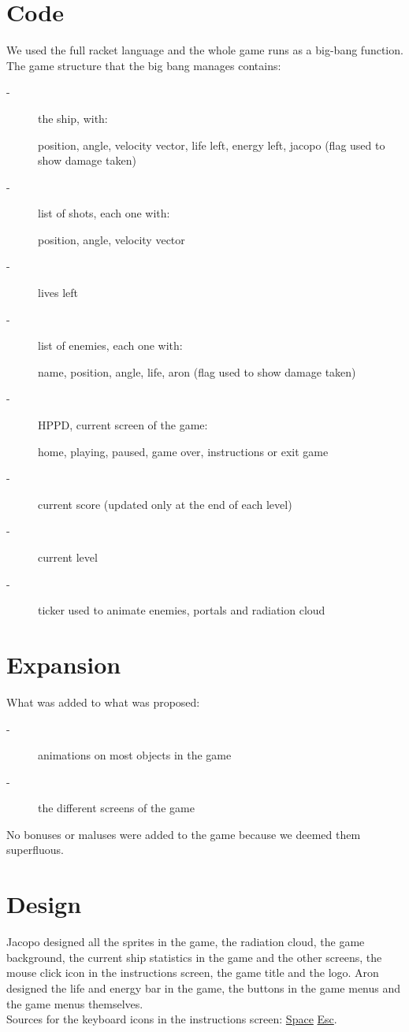 \documentclass[12pt]{article}
\begin{document}
\section*{Code}
We used the full racket language and the whole game runs as a big-bang function.
The game structure that the big bang manages contains:
\begin{description}
  \item[-] the ship, with:
  
  position, angle, velocity vector, life left, energy left, jacopo (flag used to show damage taken)
  \item[-] list of shots, each one with:
  
  position, angle, velocity vector
  \item[-] lives left
  \item[-] list of enemies, each one with:
  
  name, position, angle, life, aron (flag used to show damage taken)
  \item[-] HPPD, current screen of the game:
  
  home, playing, paused, game over, instructions or exit game
  \item[-] current score (updated only at the end of each level)
  \item[-] current level
  \item[-] ticker used to animate enemies, portals and radiation cloud
\end{description}

\section*{Expansion}
What was added to what was proposed:
\begin{description}
  \item[-] animations on most objects in the game
  \item[-] the different screens of the game
\end{description}
No bonuses or maluses were added to the game because we deemed them superfluous.


\section*{Design}
Jacopo designed all the sprites in the game, the radiation cloud, the game background, the current ship statistics in the game and the other screens, the mouse click icon in the instructions screen, the game title and the logo. Aron designed the life and energy bar in the game, the buttons in the game menus and the game menus themselves. \\
Sources for the keyboard icons in the instructions screen:
\href{http://www.wpclipart.com/computer/keyboard_keys/large_keys/computer_key_Space_bar.png.html}{Space} 
\href{http://www.clipartoday.com/freeclipart/computer/computer/keyboardkeys7.html}{Esc}.
\end{document}
